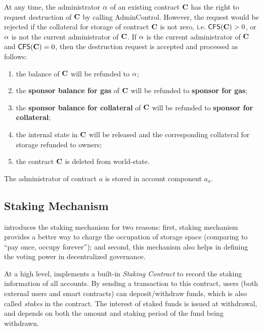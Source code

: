 At any time, the administrator $\mathbf{\alpha}$ of an existing contract $\mathbf{C}$ has the right to request destruction of $\mathbf{C}$ by calling AdminControl.
However, the request would be rejected if the collateral for storage of contract $\mathbf{C}$ is not zero, i.e. $\mathsf{CFS}(\mathbf{C})>0$, or $\mathbf{\alpha}$ is not the current administrator of $\mathbf{C}$.
If $\mathbf{\alpha}$ is the current administrator of $\mathbf{C}$ and $\mathsf{CFS}(\mathbf{C})=0$, then the destruction request is accepted and processed as follows:
\begin{enumerate}[nosep]
 	\item the balance of $\mathbf{C}$ will be refunded to $\mathbf{\alpha}$; 

	\item the \textbf{sponsor balance for gas} of $\mathbf{C}$ will be refunded to \textbf{sponsor for gas};

	\item the \textbf{sponsor balance for collateral} of $\mathbf{C}$ will be refunded to \textbf{sponsor for collateral};

	\item the internal state in $\mathbf{C}$ will be released and the corresponding collateral for storage refunded to owners;

	\item the contract $\mathbf{C}$ is deleted from world-state.
\end{enumerate} 

The administrator of contract $a$ is stored in account component $a_a$. 

\subsection{Staking Mechanism}
\label{sec:staking}

\name introduces the staking mechanism for two reasons:
first, staking mechanism provides a better way to charge the occupation of storage space (comparing to ``pay once, occupy forever'');
and second, this mechanism also helps in defining the voting power in decentralized governance.

At a high level, \name implements a built-in \emph{Staking Contract} 
to record the staking information of all accounts.
By sending a transaction to this contract, 
users (both external users and smart contracts) can deposit/withdraw funds, which is also called \emph{stakes} in the contract.
The interest of staked funds is issued at withdrawal, 
and depends on both the amount and staking period of the fund being withdrawn. 



